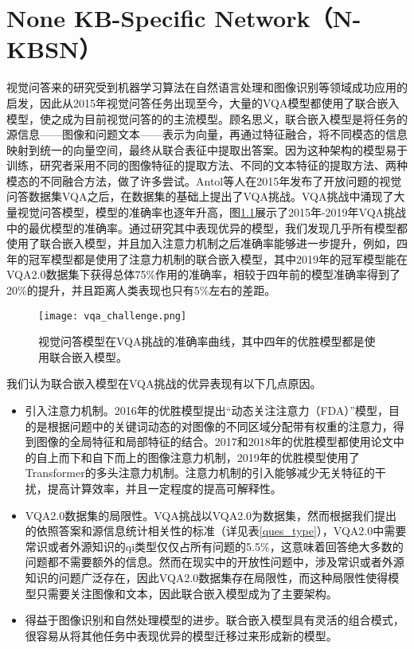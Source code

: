 
\chapter{None KB-Specific Network（N-KBSN）}
视觉问答来的研究受到机器学习算法在自然语言处理和图像识别等领域成功应用的启发，因此从2015年视觉问答任务出现至今，大量的VQA模型都使用了联合嵌入模型，使之成为目前视觉问答的的主流模型。顾名思义，联合嵌入模型是将任务的源信息——图像和问题文本——表示为向量，再通过特征融合，将不同模态的信息映射到统一的向量空间，最终从联合表征中提取出答案。因为这种架构的模型易于训练，研究者采用不同的图像特征的提取方法、不同的文本特征的提取方法、两种模态的不同融合方法，做了许多尝试。Antol等人在2015年发布了开放问题的视觉问答数据集VQA之后，在数据集的基础上提出了VQA挑战。VQA挑战中涌现了大量视觉问答模型，模型的准确率也逐年升高，图\ref{vqa_challenge}展示了2015年-2019年VQA挑战中的最优模型的准确率。通过研究其中表现优异的模型，我们发现几乎所有模型都使用了联合嵌入模型，并且加入注意力机制之后准确率能够进一步提升，例如，四年的冠军模型都是使用了注意力机制的联合嵌入模型，其中2019年的冠军模型能在VQA2.0数据集下获得总体75\%作用的准确率，相较于四年前的模型准确率得到了20\%的提升，并且距离人类表现也只有5\%左右的差距。
\begin{figure}[H]
	\texttt{[image: vqa\_challenge.png]}
	\caption{视觉问答模型在VQA挑战的准确率曲线，其中四年的优胜模型都是使用联合嵌入模型。}
	\label{vqa_challenge}
\end{figure}

我们认为联合嵌入模型在VQA挑战的优异表现有以下几点原因。
\begin{itemize}
  \item [1)] 
  引入注意力机制。2016年的优胜模型提出“动态关注注意力（FDA）”模型，目的是根据问题中的关键词动态的对图像的不同区域分配带有权重的注意力，得到图像的全局特征和局部特征的结合。2017和2018年的优胜模型都使用论文中的自上而下和自下而上的图像注意力机制，2019年的优胜模型使用了Transformer的多头注意力机制。注意力机制的引入能够减少无关特征的干扰，提高计算效率，并且一定程度的提高可解释性。
  \item [2)]
  VQA2.0数据集的局限性。VQA挑战以VQA2.0为数据集，然而根据我们提出的依照答案和源信息统计相关性的标准（详见表\ref{ques_type}），VQA2.0中需要常识或者外源知识的qi类型仅仅占所有问题的5.5\%，这意味着回答绝大多数的问题都不需要额外的信息。然而在现实中的开放性问题中，涉及常识或者外源知识的问题广泛存在，因此VQA2.0数据集存在局限性，而这种局限性使得模型只需要关注图像和文本，因此联合嵌入模型成为了主要架构。
  \item [3)]
  得益于图像识别和自然处理模型的进步。联合嵌入模型具有灵活的组合模式，很容易从将其他任务中表现优异的模型迁移过来形成新的模型。
\end{itemize}

